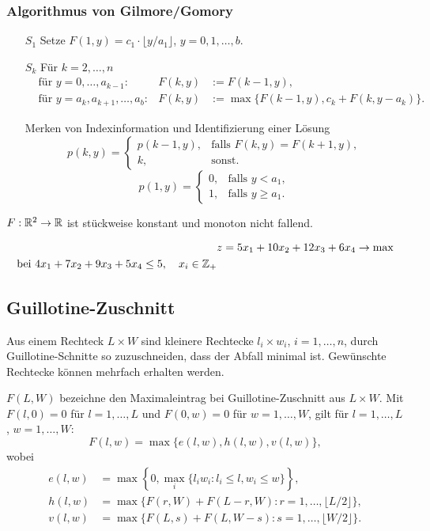\subsubsection*{Algorithmus von Gilmore/Gomory}
\begin{enumerate}
\item[$S_1$] Setze $F(1,y) = c_1 \cdot \lfloor y / a_1 \rfloor$,
  $y = 0, 1, \ldots, b$.
\item[$S_k$] Für $k = 2, \ldots, n$
  \begin{align*}
    &\text{für } y = 0, \ldots, a_{k-1}:
    & F(k,y) &:= F(k-1,y), \\
    &\text{für } y = a_k, a_{k+1}, \ldots, a_b:
    & F(k,y) &:= \max \{ F(k-1,y), c_k + F(k,y-a_k) \}.
  \end{align*}

  Merken von Indexinformation und Identifizierung einer Lösung
  \[ p(k,y) = \begin{cases}
      p(k-1,y), & \text{falls } F(k,y) = F(k+1,y), \\
      k, &\text{sonst.}
    \end{cases}
  \]
  \[ p(1,y) = \begin{cases}
      0, & \text{falls } y < a_1, \\
      1, & \text{falls } y \ge a_1.
    \end{cases}
  \]
\end{enumerate}
$F: \mathbb{R}^2 \to \mathbb{R}$ ist stückweise konstant und monoton nicht fallend.

\begin{exmp} %
  \begin{align*}
    &z = 5 x_1 + 10 x_2 + 12 x_3 + 6 x_4 \to \max \\
    \text{bei } 4 x_1 + 7 x_2 + 9 x_3 + 5 x_4 \le 5, \quad x_i \in \mathbb{Z}_+
  \end{align*}

\end{exmp}

\subsection{Guillotine-Zuschnitt}
Aus einem Rechteck $L \times W$ sind kleinere Rechtecke $l_i \times w_i$, $i =
1, \ldots, n$, durch Guillotine-Schnitte so zuzuschneiden, dass der Abfall
minimal ist. Gewünschte Rechtecke können mehrfach erhalten werden.

$F(L,W)$ bezeichne den Maximaleintrag bei Guillotine-Zuschnitt aus $L \times W$.
Mit $F(l, 0) = 0$ für $l = 1, \ldots, L$ und $F(0,w) = 0$ für $w = 1, \ldots,
W$, gilt für $l = 1, \ldots, L$, $w = 1, \ldots, W$:
\[ F(l,w) = \max \{ e(l,w), h(l,w), v(l,w) \}, \]
wobei
\begin{align*}
  e(l,w)
  &= \max \left\{ 0 , \max_i \{ l_i w_i : l_i \le l, w_i \le w \} \right\}, \\
  h(l,w)
  &= \max \{ F(r,W) + F(L-r,W) : r = 1, \ldots, \lfloor L/2 \rfloor \}, \\
  v(l,w)
  &= \max \{ F(L,s) + F(L,W-s) : s = 1, \ldots, \lfloor W/2 \rfloor \}.
\end{align*}

